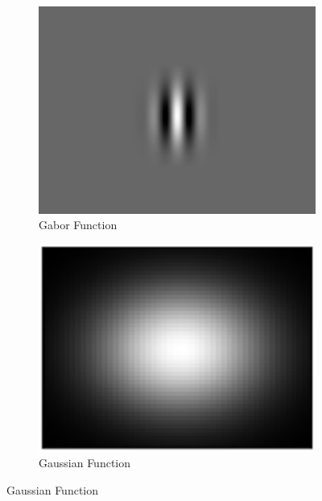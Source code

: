 \begin{figure}[h]
        \centering
        \begin{subfigure}[b]{0.3\textwidth}
                \centering
                \includegraphics[width=1.0\textwidth]{figures/LitreatureReview/GaborFunction2D.png}
                \caption{Gabor Function}
                \label{fig:gabor}
        \end{subfigure}
        \begin{subfigure}[b]{0.3\textwidth}
                \centering
                \includegraphics[width=1.0\textwidth]{figures/LitreatureReview/GaussianFunction2D.png}
                \caption{Gaussian Function}
                \label{fig:gaus}
        \end{subfigure}

\end{figure}
